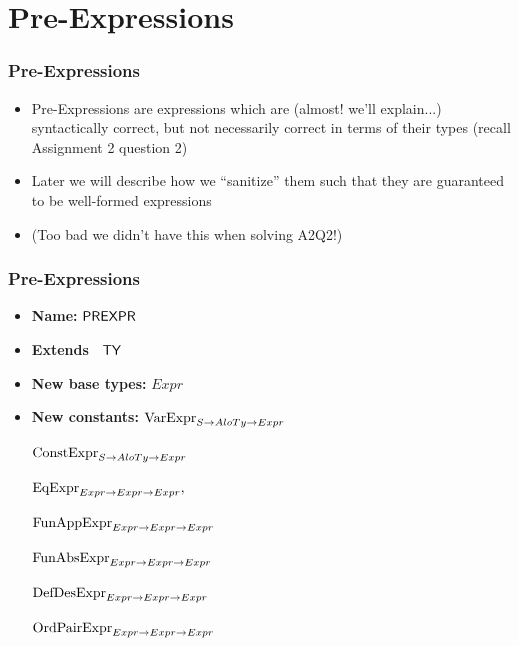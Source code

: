 \documentclass[xcolor={dvipsnames}]{beamer}
\begin{document}
\section{Pre-Expressions}
\begin{frame}
\frametitle{Pre-Expressions}
\begin{itemize}
\item Pre-Expressions are expressions which are (almost! we'll explain...) syntactically correct, but not necessarily correct in 
terms of their types (recall Assignment 2 question 2)
\item Later we will describe how we ``sanitize'' them such that they are guaranteed to be well-formed 
expressions
\item (Too bad we didn't have this when solving A2Q2!)
\end{itemize}
\end{frame}

\begin{frame}
\frametitle{Pre-Expressions}
\vspace{-2mm}
\begin{thyext}
\noindent
\begin{itemize} \setlength{\itemsep}{0pt}\vspace{-0.5cm}
\item[]\hspace{-3ex}\textbf{Name:} $\mathsf{PREXPR}$
\item[]\hspace{-3ex}\textbf{Extends\ } $\mathsf{TY}$
\item[]\hspace{-3ex}\textbf{New base types:} $Expr$
\item[]\hspace{-3ex}\textbf{New constants:}\newline
$\text{VarExpr}_{{S} \rightarrow {{AloTy} \rightarrow {Expr}}}$

$\text{ConstExpr}_{{S} \rightarrow {{AloTy} \rightarrow {Expr}}}$

$\text{EqExpr}_{{Expr} \rightarrow {{Expr} \rightarrow {Expr}}},$

$\text{FunAppExpr}_{{Expr} \rightarrow {{Expr} \rightarrow {Expr}}}$

$\text{FunAbsExpr}_{{Expr} \rightarrow {{Expr} \rightarrow {Expr}}}$

$\text{DefDesExpr}_{{Expr} \rightarrow {{Expr} \rightarrow {Expr}}}$

$\text{OrdPairExpr}_{{Expr} \rightarrow {{Expr} \rightarrow {Expr}}}$
\end{itemize}
\end{thyext}
\end{frame}
\end{document}
